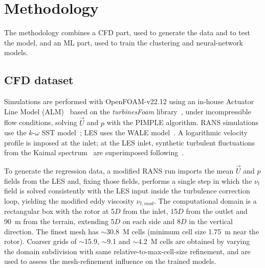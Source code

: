\documentclass[12pt,a4paper]{article}
\begin{document}
\section{Methodology}
\label{sec:methodology}
The methodology combines a CFD part, used to generate the data and to test the
model, and an ML part, used to train the clustering and neural-network models.

\subsection{CFD dataset}
Simulations are performed with OpenFOAM-v22.12 using an in-house Actuator Line
Model (ALM)~\cite{10.1115/1.1471361} based on the \textit{turbinesFoam}
library~\cite{turbinesFoam}, under incompressible flow conditions, solving
$\vec{U}$ and $p$ with the PIMPLE algorithm. RANS simulations use the
$k$-$\omega$ SST model~\cite{doi:10.2514/3.12149}; LES uses the WALE
model~\cite{WALE}. A logarithmic velocity profile is imposed at the inlet;
at the LES inlet, synthetic turbulent fluctuations from the Kaimal
spectrum~\cite{kaimal} are superimposed following~\cite{Davidson2007UsingIS,Carloni2026}.

To generate the regression data, a modified RANS run imports the mean $\vec{U}$ and $p$
fields from the LES and, fixing those fields, performs a single step in which the $\nu_t$
field is solved consistently with the LES input inside the turbulence correction loop,
yielding the modified eddy viscosity $\nu_{t,mod}$. The computational domain is a
rectangular box with the rotor at 5$D$ from the inlet, 15$D$ from the outlet and 90~m from
the terrain, extending 5$D$ on each side and 8$D$ in the vertical direction. The finest
mesh has $\sim$30.8~M cells (minimum cell size 1.75~m near the rotor). Coarser grids of
$\sim$15.9, $\sim$9.1 and $\sim$4.2~M cells are obtained by varying the domain subdivision
with same relative-to-max-cell-size refinement, and are used to assess the mesh-refinement
influence on the trained models.
\end{document}

